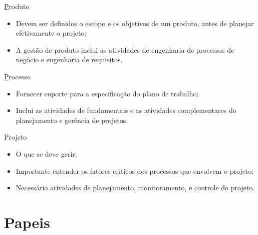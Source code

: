 \documentclass[xcolor=x11names,compress]{beamer}
\begin{document}
\begin{frame}{\underline{P}roduto}

\begin{itemize}
\itemsep 5mm

\item Devem ser definidos o escopo e os objetivos de um produto, antes de planejar efetivamente o projeto;

\item A gestão de produto inclui as atividades de engenharia de processos de negócio e engenharia de requisitos.

\end{itemize}

\end{frame}

\begin{frame}{\underline{P}rocesso}

\begin{itemize}
\itemsep 5mm

\item Fornecer suporte para a especificação do plano de trabalho;

\item Inclui as atividades de fundamentais e as atividades complementares do planejamento e gerência de projetos.

\end{itemize}

\end{frame}

\begin{frame}{Projeto}

\begin{itemize}
\itemsep 5mm

\item O que se deve gerir;

\item Importante entender os fatores críticos dos processos que envolvem o projeto;

\item Necessário atividades de planejamento, monitoramento, e controle do projeto.

\end{itemize}


\end{frame}

\section{Papeis}
\end{document}
